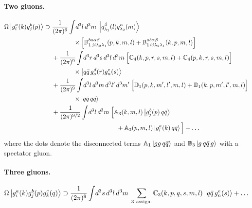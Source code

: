 \paragraph{Two gluons.}
\begin{align}
\OM\ket{\gl{a}{i}{k}\gl{b}{j}{p}}\supset\;&\frac{1}{(2\pi)^{6}}\int\!d^{3}l\,d^{3}m\;
\ket{\qk{\beta}{\lambda_{1}}{l}\aqk{\alpha}{\lambda_{2}}{m}}
\nonumber\\&\hspace{1.2cm}\times\Big[\mf B^{ba\alpha\beta}_{1\,ji\lambda_{2}\lambda_{1}}(p,k,m,l)+\mf B^{ab\alpha\beta}_{1\,ij\lambda_{2}\lambda_{1}}(k,p,m,l)\Big]
\nonumber\\
&+\frac{1}{(2\pi)^{9}}\int\!d^{3}r\,d^{3}s\,d^{3}l\,d^{3}m\;
\Big[\mf C_{4}(k,p,r,s,m,l)+\mf C_{4}(p,k,r,s,m,l)\Big]
\nonumber\\&\hspace{1.2cm}\times\ket{q\bar q\,\gl{d}{o}{r}\gl{e}{n}{s}}
\nonumber\\
&+\frac{1}{(2\pi)^{9}}\int\!d^{3}l\,d^{3}m\,d^{3}l'\,d^{3}m'\;
\Big[\mf D_{1}(p,k,m',l',m,l)+\mf D_{1}(k,p,m',l',m,l)\Big]
\nonumber\\&\hspace{1.2cm}\times\ket{q\bar q\,q\bar q}
\nonumber\\
&+\frac{1}{(2\pi)^{9/2}}\int\!d^{3}l\,d^{3}m\;\Big[\mf A_{3}(k,m,l)\ket{\gl{b}{j}{p}\,q\bar q}
\nonumber\\&\hspace{3.6cm}
+\mf A_{3}(p,m,l)\ket{\gl{a}{i}{k}\,q\bar q}\Big]+\dots
\label{eq:Omgg}
\end{align}
where the dots denote the disconnected terms $\mathbb{A}_{1}\left|gg\,q\bar q\right\rangle$ and
$\mathbb{B}_{3}\left|g\,q\bar q\,g\right\rangle$ with a spectator gluon.

\paragraph{Three gluons.}
\begin{equation}
\OM\ket{\gl{a}{i}{k}\gl{b}{j}{p}\gl{c}{k}{q}}\supset\frac{1}{(2\pi)^{9}}\int\!d^{3}s\,d^{3}l\,d^{3}m\;
\sum_{3\ \rm assign.}\mf C_{3}(k,p,q,s,m,l)\,\ket{q\bar q\,\gl{e}{n}{s}}+\dots
\label{eq:Omggg}
\end{equation}

